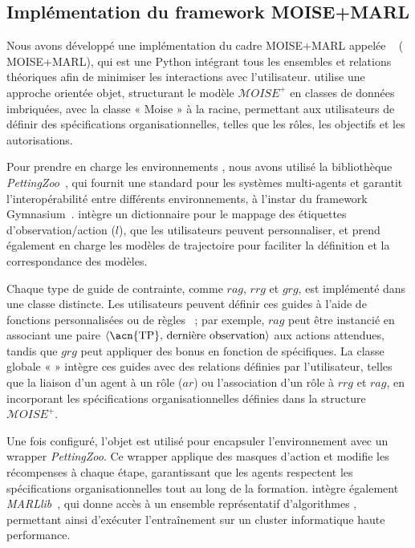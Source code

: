 \subsection{Implémentation du framework MOISE+MARL}

Nous avons développé une implémentation du cadre MOISE+MARL appelée ~\hyperref[fn:github]{\footnotemark[2]} ( MOISE+MARL), qui est une  Python intégrant tous les ensembles et relations théoriques afin de minimiser les interactions avec l'utilisateur.  utilise une approche orientée objet, structurant le modèle $\mathcal{M}OISE^+$ en classes de données imbriquées, avec la classe « Moise » à la racine, permettant aux utilisateurs de définir des spécifications organisationnelles, telles que les rôles, les objectifs et les autorisations.


Pour prendre en charge les environnements , nous avons utilisé la bibliothèque \textit{PettingZoo}~\cite{terry2020pettingzoo}, qui fournit une  standard pour les systèmes multi-agents et garantit l'interopérabilité entre différents environnements, à l'instar du framework Gymnasium~\cite{kwiatkowski2024}.  intègre un dictionnaire pour le mappage des étiquettes d'observation/action ($l$), que les utilisateurs peuvent personnaliser, et prend également en charge les modèles de trajectoire  pour faciliter la définition et la correspondance des modèles.

Chaque type de guide de contrainte, comme $rag$, $rrg$ et $grg$, est implémenté dans une classe distincte. Les utilisateurs peuvent définir ces guides à l'aide de fonctions personnalisées ou de règles ~; par exemple, $rag$ peut être instancié en associant une paire $\langle \text{\acn{TP}, dernière observation} \rangle$ aux actions attendues, tandis que $grg$ peut appliquer des bonus en fonction de  spécifiques. La classe globale «  » intègre ces guides avec des relations définies par l'utilisateur, telles que la liaison d'un agent à un rôle ($ar$) ou l'association d'un rôle à $rrg$ et $rag$, en incorporant les spécifications organisationnelles définies dans la structure $\mathcal{M}OISE^+$.

Une fois configuré, l'objet  est utilisé pour encapsuler l'environnement avec un wrapper \textit{PettingZoo}. Ce wrapper applique des masques d'action et modifie les récompenses à chaque étape, garantissant que les agents respectent les spécifications organisationnelles tout au long de la formation.  intègre également \textit{MARLlib}~\cite{hu2021marlib}, qui donne accès à un ensemble représentatif d'algorithmes , permettant ainsi d'exécuter l'entraînement sur un cluster informatique haute performance.

